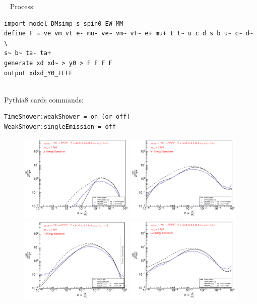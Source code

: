 \documentclass[epj,nopacs,fleqn]{svjour}
\begin{document}
\MG~ Process:
\begin{verbatim}
import model DMsimp_s_spin0_EW_MM
define F = ve vm vt e- mu- ve~ vm~ vt~ e+ mu+ t t~ u c d s b u~ c~ d~ \
s~ b~ ta- ta+
generate xd xd~ > y0 > F F F F
output xdxd_Y0_FFFF
\end{verbatim}
%
\\


Pythia8 cards commands:
\begin{verbatim}
TimeShower:weakShower = on (or off)
WeakShower:singleEmission = off
\end{verbatim}



\begin{figure}[!b]
\centering
\subfigure
{ \includegraphics[width=0.49\textwidth]{Fig/xdxd_Y0/1_antiprotons_FFFF_xdxd_1.pdf}}
\subfigure
{ \includegraphics[width=0.49\textwidth]{Fig/xdxd_Y0/1_positrons_FFFF_xdxd_1.pdf}}
\subfigure
{ \includegraphics[width=0.49\textwidth]{Fig/xdxd_Y0/1_gammas_FFFF_xdxd_1.pdf}}
\subfigure
{ \includegraphics[width=0.49\textwidth]{Fig/xdxd_Y0/1_neutrinos_e_FFFF_xdxd_1.pdf}}

\end{figure}
\end{document}
